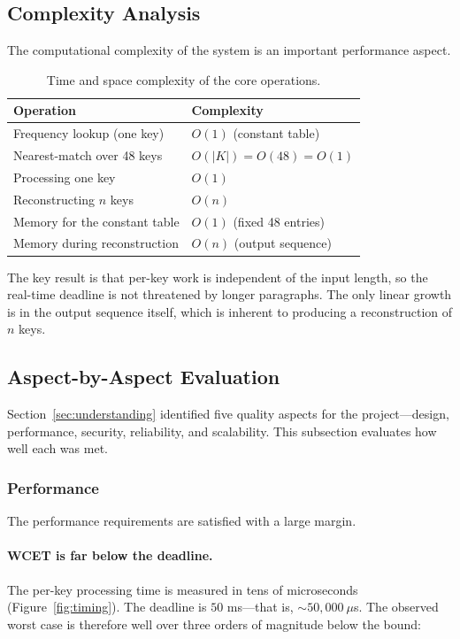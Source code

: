 \documentclass[11pt,a4paper]{article}
\begin{document}
\subsection{Complexity Analysis}

The computational complexity of the system is an important performance aspect.

\begin{table}[H]
    \centering
    \begin{tabular}{@{}ll@{}}
        \toprule
        \textbf{Operation} & \textbf{Complexity} \\
        \midrule
        Frequency lookup (one key) & $O(1)$ (constant table) \\
        Nearest-match over 48 keys & $O(|K|) = O(48) = O(1)$ \\
        Processing one key & $O(1)$ \\
        Reconstructing $n$ keys & $O(n)$ \\
        Memory for the constant table & $O(1)$ (fixed 48 entries) \\
        Memory during reconstruction & $O(n)$ (output sequence) \\
        \bottomrule
    \end{tabular}
    \caption{Time and space complexity of the core operations.}
    \label{tab:complexity}
\end{table}

The key result is that per-key work is independent of the input length, so the
real-time deadline is not threatened by longer paragraphs. The only linear
growth is in the output sequence itself, which is inherent to producing a
reconstruction of $n$ keys.

\subsection{Aspect-by-Aspect Evaluation}

Section~\ref{sec:understanding} identified five quality aspects for the
project---design, performance, security, reliability, and scalability. This
subsection evaluates how well each was met.

\subsubsection{Performance}

The performance requirements are satisfied with a large margin.

\paragraph{WCET is far below the deadline.}
The per-key processing time is measured in tens of microseconds
(Figure~\ref{fig:timing}). The deadline is $50$ ms---that is, $\sim 50{,}000\
\mu$s. The observed worst case is therefore well over three orders of
magnitude below the bound:
\end{document}
